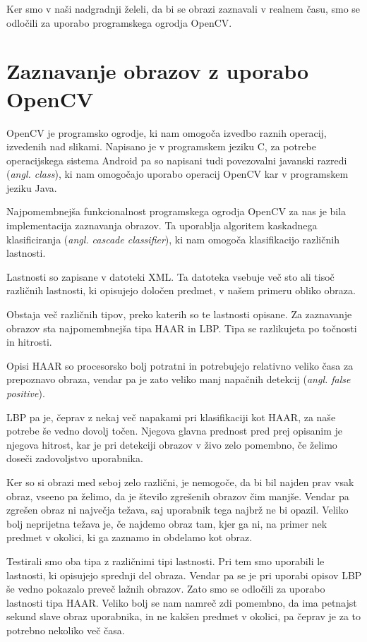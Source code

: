 \documentclass[a4paper, 12pt]{book}
\begin{document}
Ker smo v naši nadgradnji želeli, da bi se obrazi zaznavali v realnem času,
smo se odločili za uporabo programskega ogrodja OpenCV.


\section{Zaznavanje obrazov z uporabo OpenCV}
\label{sec:zaznavanjeObrazovOpenCV}
OpenCV je programsko ogrodje, ki nam omogoča izvedbo raznih operacij,
izvedenih nad slikami. Napisano je v programskem jeziku C, za potrebe
operacijskega sistema Android pa so napisani tudi povezovalni javanski razredi
(\textit{angl. class}), ki nam omogočajo uporabo operacij OpenCV kar v
programskem jeziku Java.

Najpomembnejša funkcionalnost programskega ogrodja OpenCV za nas je bila
implementacija zaznavanja obrazov. Ta uporablja algoritem kaskadnega
klasificiranja (\textit{angl. cascade classifier}), ki nam omogoča
klasifikacijo različnih lastnosti.

Lastnosti so zapisane v datoteki XML. Ta datoteka vsebuje več sto ali tisoč
različnih lastnosti, ki opisujejo določen predmet, v našem primeru obliko obraza.

Obstaja več različnih tipov, preko katerih so te lastnosti opisane. Za
zaznavanje obrazov sta najpomembnejša tipa HAAR in LBP. Tipa se
razlikujeta po točnosti in hitrosti.

Opisi HAAR so procesorsko bolj potratni in potrebujejo relativno veliko
časa za prepoznavo obraza, vendar pa je zato veliko manj napačnih detekcij
(\textit{angl. false positive}).

LBP pa je, čeprav z nekaj več napakami pri klasifikaciji kot HAAR, za
naše potrebe še vedno dovolj točen. Njegova glavna prednost pred prej
opisanim je njegova hitrost, kar je pri detekciji obrazov v živo zelo
pomembno, če želimo doseči zadovoljstvo uporabnika.

Ker so si obrazi med seboj zelo različni, je nemogoče, da bi bil najden prav
vsak obraz, vseeno pa želimo, da je število zgrešenih obrazov čim manjše.
Vendar pa zgrešen obraz ni največja težava, saj uporabnik tega najbrž ne bi
opazil. Veliko bolj neprijetna težava je, če najdemo obraz tam, kjer ga ni, na
primer nek predmet v okolici, ki ga zaznamo in obdelamo kot obraz.

Testirali smo oba tipa z različnimi tipi lastnosti. Pri tem smo uporabili le
lastnosti, ki opisujejo sprednji del obraza. Vendar pa se je pri uporabi
opisov LBP še vedno pokazalo preveč lažnih obrazov. Zato smo se odločili
za uporabo lastnosti tipa HAAR. Veliko bolj se nam namreč zdi pomembno, da
ima petnajst sekund slave obraz uporabnika, in ne kakšen predmet v okolici, pa
čeprav je za to potrebno nekoliko več časa.
\end{document}

